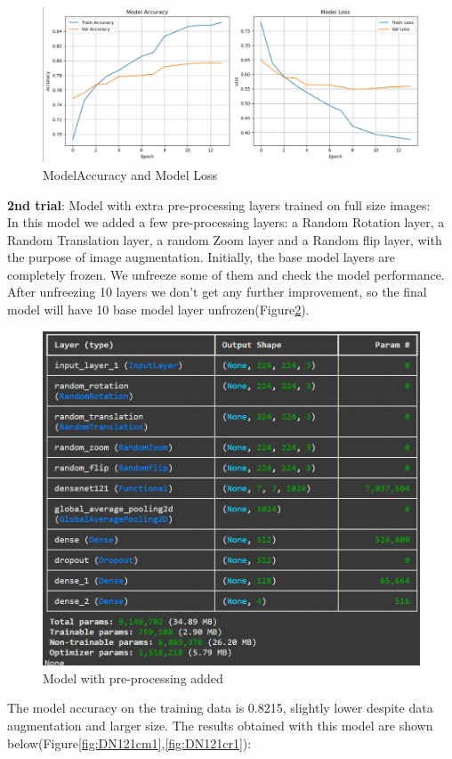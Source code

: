 \documentclass{article}
\begin{document}
\begin{figure}[H]
    \centering
    \includegraphics[width=0.8\linewidth]{DN121graphsmall.png}
    \caption{ModelAccuracy and Model Loss}
    \label{fig:DN121graphsmall}
\end{figure}

\textbf{2nd trial}: Model with extra pre-processing layers trained on full size images:\\
In this model we added a few pre-processing layers: a Random Rotation layer, a Random Translation layer, a random Zoom layer and a Random flip layer, with the purpose of image augmentation.
Initially, the base model layers are completely frozen. We unfreeze some of them and check the model performance. After unfreezing 10 layers we don't get any further improvement, so the final model will have 10 base model layer unfrozen(Figure\ref{fig:DN121arch1}). 

 \begin{figure}[H]
    \centering
    \includegraphics[width=0.8\linewidth]{DN121arch1.png}
    \caption{Model with pre-processing added}
    \label{fig:DN121arch1}
\end{figure}

The model accuracy on the training data is 0.8215, slightly lower despite data augmentation and larger size. The results obtained with this model are shown below(Figure\ref{fig:DN121cm1},\ref{fig:DN121cr1}):
\end{document}
